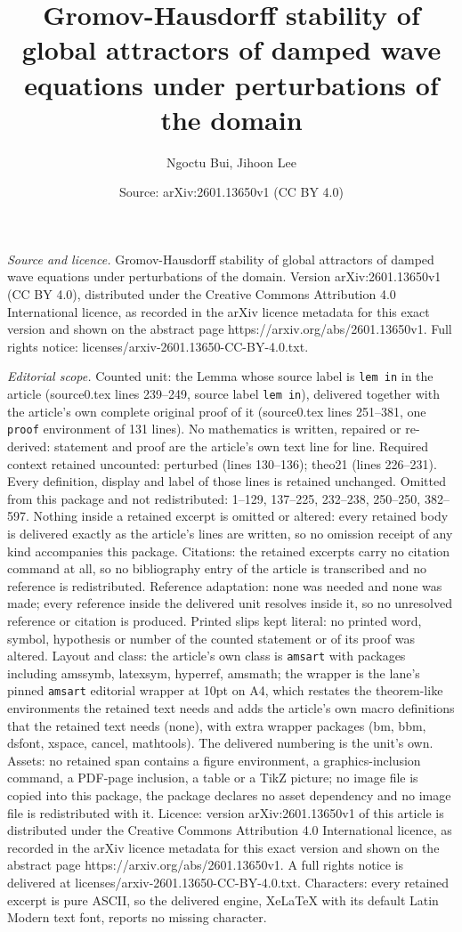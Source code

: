 \documentclass[10pt,a4paper]{amsart}
\title[Gromov-Hausdorff stability of global attractors of damped wa]{Gromov-Hausdorff stability of global attractors of damped wave equations under perturbations of the domain}
\author{Ngoctu Bui, Jihoon Lee}
\date{Source: arXiv:2601.13650v1 (CC BY 4.0)}
\begin{document}
\maketitle

\noindent\emph{Source and licence.} Gromov-Hausdorff stability of global attractors of damped wave equations under perturbations of the domain. Version arXiv:2601.13650v1 (CC BY 4.0), distributed under the Creative Commons Attribution 4.0 International licence, as recorded in the arXiv licence metadata for this exact version and shown on the abstract page https://arxiv.org/abs/2601.13650v1. Full rights notice: licenses/arxiv-2601.13650-CC-BY-4.0.txt.\par\smallskip

\noindent\textit{Editorial scope.} Counted unit: the Lemma whose source label is \texttt{lem in} in the article (source0.tex lines 239--249, source label \texttt{lem in}), delivered together with the article's own complete original proof of it (source0.tex lines 251--381, one \texttt{proof} environment of 131 lines). No mathematics is written, repaired or re-derived: statement and proof are the article's own text line for line. Required context retained uncounted: perturbed (lines 130--136); theo21 (lines 226--231). Every definition, display and label of those lines is retained unchanged. Omitted from this package and not redistributed: 1--129, 137--225, 232--238, 250--250, 382--597. Nothing inside a retained excerpt is omitted or altered: every retained body is delivered exactly as the article's lines are written, so no omission receipt of any kind accompanies this package. Citations: the retained excerpts carry no citation command at all, so no bibliography entry of the article is transcribed and no reference is redistributed. Reference adaptation: none was needed and none was made; every reference inside the delivered unit resolves inside it, so no unresolved reference or citation is produced. Printed slips kept literal: no printed word, symbol, hypothesis or number of the counted statement or of its proof was altered. Layout and class: the article's own class is \texttt{amsart} with packages including amssymb, latexsym, hyperref, amsmath; the wrapper is the lane's pinned \texttt{amsart} editorial wrapper at 10pt on A4, which restates the theorem-like environments the retained text needs and adds the article's own macro definitions that the retained text needs (none), with extra wrapper packages (bm, bbm, dsfont, xspace, cancel, mathtools). The delivered numbering is the unit's own. Assets: no retained span contains a figure environment, a graphics-inclusion command, a PDF-page inclusion, a table or a TikZ picture; no image file is copied into this package, the package declares no asset dependency and no image file is redistributed with it. Licence: version arXiv:2601.13650v1 of this article is distributed under the Creative Commons Attribution 4.0 International licence, as recorded in the arXiv licence metadata for this exact version and shown on the abstract page https://arxiv.org/abs/2601.13650v1. A full rights notice is delivered at licenses/arxiv-2601.13650-CC-BY-4.0.txt. Characters: every retained excerpt is pure ASCII, so the delivered engine, XeLaTeX with its default Latin Modern text font, reports no missing character.
\end{document}
